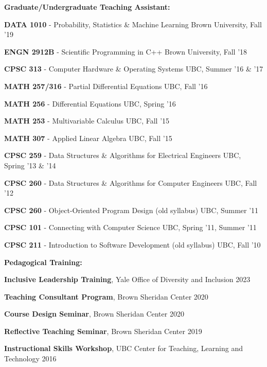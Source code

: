 \documentclass[margin,line]{res}
\newenvironment{list1}{
  \begin{list}{\ding{113}}{
      \setlength{\itemsep}{0in}
      \setlength{\parsep}{0in} \setlength{\parskip}{0in}
      \setlength{\topsep}{0in} \setlength{\partopsep}{0in}
      \setlength{\leftmargin}{0.17in}}}{\end{list}}
\begin{document}
\begin{resume}

\textbf{Graduate/Undergraduate Teaching Assistant:}
\vspace*{.2cm}

\begin{list1}
\setlength\itemsep{0.25em}
\item[] {\bf DATA 1010} - Probability, Statistics \& Machine Learning \hfill Brown University, Fall '19
\item[] {\bf ENGN 2912B} - Scientific Programming in C++ \hfill Brown University, Fall '18
\item[] {\bf CPSC 313} - Computer Hardware \& Operating Systems \hfill UBC, Summer '16 \& '17
\item[] {\bf MATH 257/316} - Partial Differential Equations \hfill UBC, Fall '16
\item[] {\bf MATH 256} - Differential Equations \hfill UBC, Spring '16
\item[] {\bf MATH 253} - Multivariable Calculus \hfill UBC, Fall '15
\item[] {\bf MATH 307} - Applied Linear Algebra \hfill UBC, Fall '15
\item[] {\bf CPSC 259} - Data Structures \& Algorithms for Electrical Engineers \hfill UBC, Spring '13 \& '14
\item[] {\bf CPSC 260} - Data Structures \& Algorithms for Computer Engineers \hfill UBC, Fall '12
\item[] {\bf CPSC 260} - Object-Oriented Program Design (old syllabus) \hfill UBC, Summer '11
\item[] {\bf CPSC 101} - Connecting with Computer Science \hfill UBC, Spring '11, Summer '11
\item[] {\bf CPSC 211} - Introduction to Software Development (old syllabus) \hfill UBC, Fall '10
\end{list1}

\textbf{Pedagogical Training:}
\vspace*{.2cm}

\begin{list1}
\setlength\itemsep{0.25em}
\item[] {\bf Inclusive Leadership Training}, Yale Office of Diversity and Inclusion \hfill 2023
\item[] {\bf Teaching Consultant Program}, Brown Sheridan Center \hfill 2020
\item[] {\bf Course Design Seminar}, Brown Sheridan Center \hfill 2020
\item[] {\bf Reflective Teaching Seminar}, Brown Sheridan Center \hfill 2019
\item[] {\bf Instructional Skills Workshop}, UBC Center for Teaching, Learning and Technology \hfill 2016
\end{list1} 


\end{resume}
\end{document}

